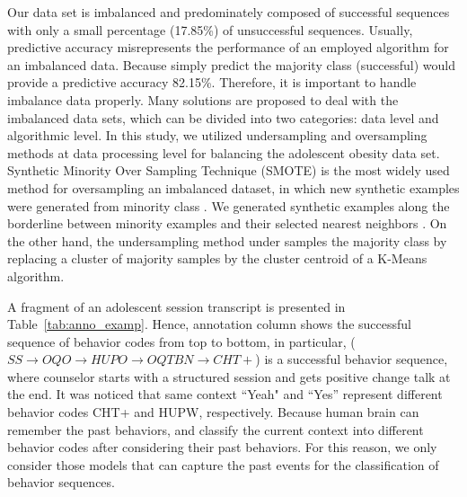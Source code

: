 \documentclass{amia_summit_2018}
\begin{document}
Our data set is imbalanced and predominately composed of successful sequences with only a small percentage (17.85\%) of unsuccessful sequences. Usually, predictive accuracy misrepresents the performance of an employed algorithm for an imbalanced data. Because simply predict the majority class (successful) would provide a predictive accuracy 82.15\%. Therefore, it is important to handle imbalance data properly. Many solutions are proposed to deal with the imbalanced data sets, which can be divided into two categories: data level and algorithmic level. In this study, we utilized undersampling and oversampling methods at data processing level for balancing the adolescent obesity data set. Synthetic Minority Over Sampling Technique (SMOTE) is the most widely used method for oversampling an imbalanced dataset, in which new synthetic examples were generated from minority class \cite{chawla2002smote}. We generated synthetic examples along the borderline between minority examples and their selected nearest neighbors \cite{nguyen2011borderline}. On the other hand, the undersampling method under samples the majority class by replacing a cluster of majority samples by the cluster centroid of a K-Means algorithm.  

A fragment of an adolescent session transcript is presented in Table~\ref{tab:anno_examp}. Hence, annotation column shows the successful sequence of behavior codes from top to bottom, in particular, ($SS\rightarrow OQO\rightarrow HUPO\rightarrow OQTBN\rightarrow CHT+$) is a successful behavior sequence, where counselor starts with a structured session and gets positive change talk at the end. It was noticed that same context ``Yeah" and ``Yes'' represent different behavior codes CHT+ and HUPW, respectively. Because human brain can remember the past behaviors, and classify the current context into different behavior codes after considering their past behaviors. For this reason, we only consider those models that can capture the past events for the classification of behavior sequences.\\
\end{document}
